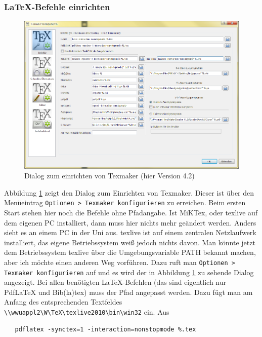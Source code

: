 \subsubsection{\LaTeX-Befehle einrichten}\label{sec:texmaker_conf}

\begin{figure}[bh]
\includegraphics[width=\textwidth]{Bilder/Texmaker_konfigurieren.png}
\caption{Dialog zum einrichten von Texmaker (hier Version 4.2)}
\label{img:texmaker_conf}
\end{figure}

Abbildung \ref{img:texmaker_conf} zeigt den Dialog zum Einrichten von Texmaker. Dieser ist über den Menüeintrag \verb+Optionen > Texmaker konfigurieren+ zu erreichen. Beim ersten Start stehen hier noch die Befehle ohne Pfadangabe. Ist MiKTex, oder texlive auf dem eigenen PC installiert, dann muss hier nichts mehr geändert werden. Anders sieht es an einem PC in der Uni aus. texlive ist auf einem zentralen Netzlaufwerk installiert, das eigene Betriebssystem weiß jedoch nichts davon. Man könnte jetzt dem Betriebssystem texlive über die Umgebungsvariable PATH bekannt machen, aber ich möchte einen anderen Weg vorführen. Dazu ruft man \verb+Optionen > Texmaker konfigurieren+ auf und es wird der in Abbildung \ref{img:texmaker_conf} zu sehende Dialog angezeigt. Bei allen benötigten \LaTeX-Befehlen (das sind eigentlich nur PdfLaTeX und Bib(la)tex) muss der Pfad angepasst werden. Dazu fügt man am Anfang des entsprechenden Textfeldes \verb+\\wwuappl2\W\TeX\texlive2010\bin\win32+ ein. Aus

\begin{verbatim}
   pdflatex -synctex=1 -interaction=nonstopmode %.tex
\end{verbatim}

